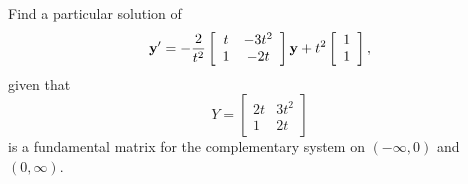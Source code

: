\begin{example}
  \label{example:10.7.3} \rm Find a particular solution of
  \begin{equation}
    \label{eq:10.7.7}{\bf y}'=-\frac{2}{t^{2}}\left[
    \begin{array}{cc}
      t & -3t^{2} \\
      1 & -2t
    \end{array}\right]{\bf y}+t^{2}\left[\begin{array}{l}1\\1\end{array}\right],
  \end{equation}
  given that
  \[
    Y=\left[
    \begin{array}{cc}
      2t & 3t^{2} \\
      1  & 2t
    \end{array}\right]
  \]
  is a fundamental matrix for the complementary system on $(-\infty,0)$ and $(0,\infty)$.
\end{example}

